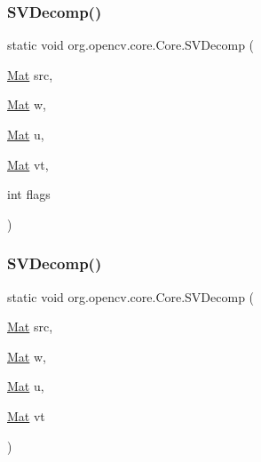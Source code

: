\mbox{\label{classorg_1_1opencv_1_1core_1_1_core_a8b6381c8ddf094439720386b1acdb9ce}} 
\subsubsection{\texorpdfstring{S\+V\+Decomp()}{SVDecomp()}\hspace{0.1cm}{\footnotesize\ttfamily [1/2]}}
{\footnotesize\ttfamily static void org.\+opencv.\+core.\+Core.\+S\+V\+Decomp (\begin{DoxyParamCaption}\item[{\mbox{\hyperlink{classorg_1_1opencv_1_1core_1_1_mat}{Mat}}}]{src,  }\item[{\mbox{\hyperlink{classorg_1_1opencv_1_1core_1_1_mat}{Mat}}}]{w,  }\item[{\mbox{\hyperlink{classorg_1_1opencv_1_1core_1_1_mat}{Mat}}}]{u,  }\item[{\mbox{\hyperlink{classorg_1_1opencv_1_1core_1_1_mat}{Mat}}}]{vt,  }\item[{int}]{flags }\end{DoxyParamCaption})\hspace{0.3cm}{\ttfamily [static]}}

\mbox{\label{classorg_1_1opencv_1_1core_1_1_core_aa2a097bef3c1f59efe29e6a723640851}} 
\subsubsection{\texorpdfstring{S\+V\+Decomp()}{SVDecomp()}\hspace{0.1cm}{\footnotesize\ttfamily [2/2]}}
{\footnotesize\ttfamily static void org.\+opencv.\+core.\+Core.\+S\+V\+Decomp (\begin{DoxyParamCaption}\item[{\mbox{\hyperlink{classorg_1_1opencv_1_1core_1_1_mat}{Mat}}}]{src,  }\item[{\mbox{\hyperlink{classorg_1_1opencv_1_1core_1_1_mat}{Mat}}}]{w,  }\item[{\mbox{\hyperlink{classorg_1_1opencv_1_1core_1_1_mat}{Mat}}}]{u,  }\item[{\mbox{\hyperlink{classorg_1_1opencv_1_1core_1_1_mat}{Mat}}}]{vt }\end{DoxyParamCaption})\hspace{0.3cm}{\ttfamily [static]}}

